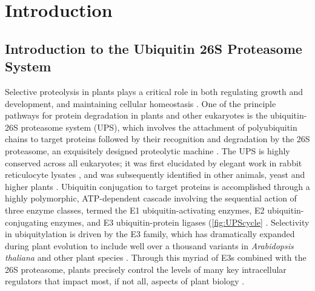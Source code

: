 \chapter{Introduction}


\section{Introduction to the Ubiquitin 26S Proteasome System}
Selective proteolysis in plants plays a critical role in both regulating growth and development, and maintaining cellular homeostasis \citep{nelson14, smalle04, vierstra93, vierstra09}.  One of the principle pathways for protein degradation in plants and other eukaryotes is the ubiquitin-26S proteasome system (UPS), which involves the attachment of polyubiquitin chains to target proteins followed by their recognition and degradation by the 26S proteasome, an exquisitely designed proteolytic machine \citep{bhattacharyya14, finley09, vierstra09}.  The UPS is highly conserved across all eukaryotes; it was first elucidated by elegant work in rabbit reticulocyte lysates \citep{ciechanover80, ciechanover80-frAQB, etlinger77, hershko80, wilkinson80}, and was subsequently identified in other animals, yeast and higher plants \citep{ciechanover84, finley84, finley87, glotzer91, hochstrasser91, shanklin87}.  Ubiquitin conjugation to target proteins is accomplished through a highly polymorphic, ATP-dependent cascade involving the sequential action of three enzyme classes, termed the E1 ubiquitin-activating enzymes, E2 ubiquitin-conjugating enzymes, and E3 ubiquitin-protein ligases (\ref{fig:UPScycle} \citep{berndsen14, smalle04, vierstra09}.  Selectivity in ubiquitylation is driven by the E3 family, which has dramatically expanded during plant evolution to include well over a thousand variants in \textit{Arabidopsis thaliana} and other plant species \citep{hua13, hua11}.  Through this myriad of E3s combined with the 26S proteasome, plants precisely control the levels of many key intracellular regulators that impact most, if not all, aspects of plant biology \citep{kim13, vierstra09}.
